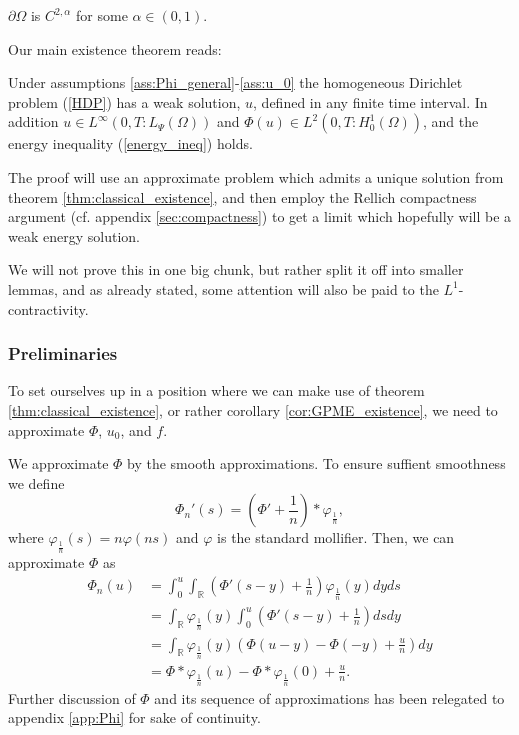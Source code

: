 \documentclass[11pt, a4paper]{article}
\begin{document}
\begin{assumption}
\label{ass:smooth_boundary}
$\partial \Omega$ is $C^{2,\alpha}$ for some $\alpha \in (0,1)$.
\end{assumption}


Our main existence theorem reads:
\begin{theorem}
\label{thm:weak_existence}
Under assumptions \ref{ass:Phi_general}-\ref{ass:u_0} the homogeneous Dirichlet problem (\ref{HDP}) has a weak solution, $u$, defined in any finite time interval. In addition $u \in L^\infty(0,T:L_\Psi(\Omega))$ and $\Phi(u) \in L^2(0,T:H_0^1(\Omega))$, and the energy inequality (\ref{energy_ineq}) holds.
\end{theorem}

The proof will use an approximate problem which admits a unique solution from theorem \ref{thm:classical_existence}, and then employ the Rellich compactness argument (cf. appendix \ref{sec:compactness}) to get a limit which hopefully will be a weak energy solution.

We will not prove this in one big chunk, but rather split it off into smaller lemmas, and as already stated, some attention will also be paid to the $L^1$-contractivity.
\subsubsection{Preliminaries}
\label{sec:approximations}
To set ourselves up in a position where we can make use of theorem \ref{thm:classical_existence}, or rather corollary \ref{cor:GPME_existence}, we need to approximate $\Phi$, $u_0$, and $f$.

We approximate $\Phi$ by the smooth approximations. To ensure suffient smoothness we define
\begin{equation*}
\Phi_n'(s) = \left( \Phi' + \frac{1}{n}\right)*\varphi_{\frac{1}{n}},
\end{equation*}
where $\varphi_{\frac{1}{n}}(s) = n\varphi(ns)$ and $\varphi$ is the standard mollifier. Then, we can approximate $\Phi$ as
\begin{align*}
\Phi_n(u) &= \int_0^u \int_\mathbb{R}\left( \Phi'(s-y) + \frac{1}{n}\right)\varphi_{\frac{1}{n}}(y)dyds \\
&= \int_\mathbb{R}\varphi_{\frac{1}{n}}(y) \int_0^u \left( \Phi'(s-y) + \frac{1}{n}\right)dsdy \\
&= \int_\mathbb{R}\varphi_{\frac{1}{n}}(y) \left( \Phi(u-y) - \Phi(-y) + \frac{u}{n}\right)dy \\
&= \Phi * \varphi_{\frac{1}{n}}(u) - \Phi * \varphi_{\frac{1}{n}}(0) + \frac{u}{n}.
\end{align*}
Further discussion of $\Phi$ and its sequence of approximations has been relegated to appendix \ref{app:Phi} for sake of continuity.
\end{document}
